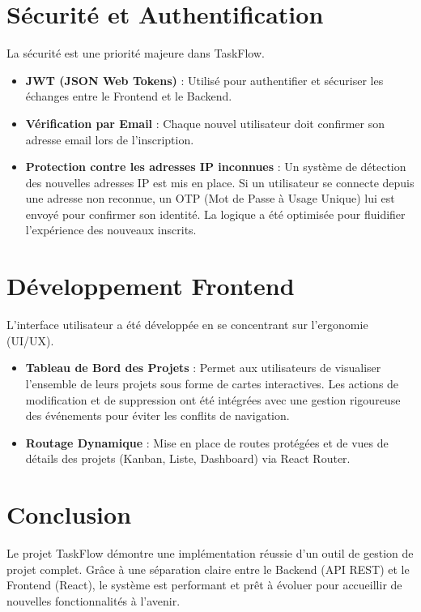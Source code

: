 \documentclass[12pt,a4paper]{article}
\begin{document}
\section{Sécurité et Authentification}
La sécurité est une priorité majeure dans TaskFlow.
\begin{itemize}
    \item \textbf{JWT (JSON Web Tokens)} : Utilisé pour authentifier et sécuriser les échanges entre le Frontend et le Backend.
    \item \textbf{Vérification par Email} : Chaque nouvel utilisateur doit confirmer son adresse email lors de l'inscription.
    \item \textbf{Protection contre les adresses IP inconnues} : Un système de détection des nouvelles adresses IP est mis en place. Si un utilisateur se connecte depuis une adresse non reconnue, un OTP (Mot de Passe à Usage Unique) lui est envoyé pour confirmer son identité. La logique a été optimisée pour fluidifier l'expérience des nouveaux inscrits.
\end{itemize}

\section{Développement Frontend}
L'interface utilisateur a été développée en se concentrant sur l'ergonomie (UI/UX).
\begin{itemize}
    \item \textbf{Tableau de Bord des Projets} : Permet aux utilisateurs de visualiser l'ensemble de leurs projets sous forme de cartes interactives. Les actions de modification et de suppression ont été intégrées avec une gestion rigoureuse des événements pour éviter les conflits de navigation.
    \item \textbf{Routage Dynamique} : Mise en place de routes protégées et de vues de détails des projets (Kanban, Liste, Dashboard) via React Router.
\end{itemize}

\section{Conclusion}
Le projet TaskFlow démontre une implémentation réussie d'un outil de gestion de projet complet. Grâce à une séparation claire entre le Backend (API REST) et le Frontend (React), le système est performant et prêt à évoluer pour accueillir de nouvelles fonctionnalités à l'avenir.
\end{document}

